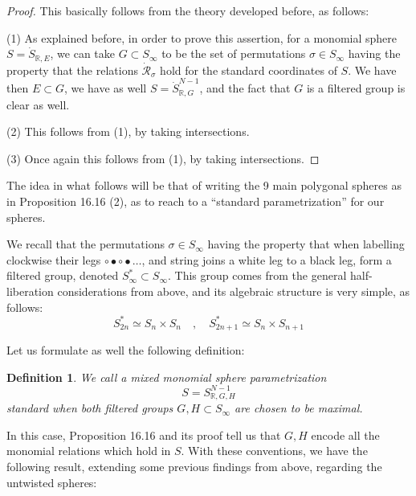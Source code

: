 \documentclass[12pt]{amsbook}
\newtheorem{definition}[theorem]{Definition}
\begin{document}
\begin{proof}
This basically follows from the theory developed before, as follows:

\medskip

(1) As explained before, in order to prove this assertion, for a monomial sphere $S=\dot{S}_{\mathbb R,E}$, we can take $G\subset S_\infty$ to be the set of permutations $\sigma\in S_\infty$ having the property that the relations $\dot{\mathcal R}_\sigma$ hold for the standard coordinates of $S$. We have then $E\subset G$, we have as well $S=\dot{S}^{N-1}_{\mathbb R,G}$, and the fact that $G$ is a filtered group is clear as well.

\medskip

(2) This follows from (1), by taking intersections.

\medskip

(3) Once again this follows from (1), by taking intersections.
\end{proof}

The idea in what follows will be that of writing the 9 main polygonal spheres as in Proposition 16.16 (2), as to reach to a ``standard parametrization'' for our spheres. 

\bigskip

We recall that the permutations $\sigma\in S_\infty$ having the property that when labelling clockwise their legs $\circ\bullet\circ\bullet\ldots$, and string joins a white leg to a black leg, form a filtered group, denoted $S_\infty^*\subset S_\infty$. This group comes from the general half-liberation considerations from above, and its algebraic structure is very simple, as follows:
$$S_{2n}^*\simeq S_n\times S_n\quad,\quad 
S_{2n+1}^*\simeq S_n\times S_{n+1}$$

Let us formulate as well the following definition:


\begin{definition}
We call a mixed monomial sphere parametrization 
$$S=S^{N-1}_{\mathbb R,G,H}$$
standard when both filtered groups $G,H\subset S_\infty$ are chosen to be maximal.
\end{definition}

In this case, Proposition 16.16 and its proof tell us that $G,H$ encode all the monomial relations which hold in $S$. With these conventions, we have the following result, extending some previous findings from above, regarding the untwisted spheres:
\end{document}
